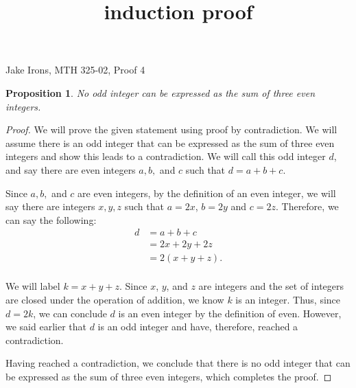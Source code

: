 \documentclass[11 pt]{article}
\title{induction proof}
\newtheorem{proposition}{Proposition}
\newcommand{\newpar}{\vspace{.15in}\noindent}
\begin{document}
\noindent Jake Irons, MTH 325-02, Proof 4

\newpar
\begin{proposition}
No odd integer can be expressed as the sum of three even integers.
\end{proposition}
\begin{proof}
We will prove the given statement using proof by contradiction. We will assume there is an odd integer that can be expressed as the sum of three even integers and show this leads to a contradiction. We will call this odd integer $d$, and say there are even integers $a, b,$ and $c$ such that $d=a+b+c$.

\newpar
Since $a, b,$ and $c$ are even integers, by the definition of an even integer, we will say there are integers $x, y, z$ such that $a=2x$, $b=2y$ and $c=2z$. Therefore, we can say the following:
\begin{align*}
d&=a+b+c \\
&=2x+2y+2z \\
&=2(x+y+z). \\
\end{align*}

\newpar
We will label $k=x+y+z$. Since $x$, $y$, and $z$ are integers and the set of integers are closed under the operation of addition, we know $k$ is an integer. Thus, since $d=2k$, we can conclude $d$ is an even integer by the definition of even. However, we said earlier that $d$ is an odd integer and have, therefore, reached a contradiction.

\newpar
Having reached a contradiction, we conclude that there is no odd integer that can be expressed as the sum of three even integers, which completes the proof.
\end{proof}
\end{document}
